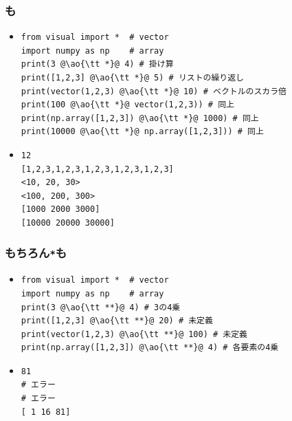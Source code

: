 \documentclass[10pt,dvipdfmx]{beamer}
\newcommand{\ao}[1]{{\color{blue}#1}}
\begin{document}
\begin{frame}[fragile]
\frametitle{{\tt *}も}
\begin{itemize}
\item<1-> []
\begin{lstlisting}
from visual import *  # vector
import numpy as np    # array
print(3 @\ao{\tt *}@ 4) # 掛け算
print([1,2,3] @\ao{\tt *}@ 5) # リストの繰り返し
print(vector(1,2,3) @\ao{\tt *}@ 10) # ベクトルのスカラ倍
print(100 @\ao{\tt *}@ vector(1,2,3)) # 同上
print(np.array([1,2,3]) @\ao{\tt *}@ 1000) # 同上
print(10000 @\ao{\tt *}@ np.array([1,2,3])) # 同上
\end{lstlisting}
\item<2-> []
\begin{lstlisting}
12
[1,2,3,1,2,3,1,2,3,1,2,3,1,2,3]
<10, 20, 30>
<100, 200, 300>
[1000 2000 3000]
[10000 20000 30000]
\end{lstlisting}
\end{itemize}
\end{frame}


\begin{frame}[fragile]
\frametitle{もちろん{\tt **}も}
\begin{itemize}
\item<1-> []
\begin{lstlisting}
from visual import *  # vector
import numpy as np    # array
print(3 @\ao{\tt **}@ 4) # 3の4乗
print([1,2,3] @\ao{\tt **}@ 20) # 未定義
print(vector(1,2,3) @\ao{\tt **}@ 100) # 未定義
print(np.array([1,2,3]) @\ao{\tt **}@ 4) # 各要素の4乗
\end{lstlisting}
\item<2-> []
\begin{lstlisting}
81
# エラー
# エラー
[ 1 16 81]
\end{lstlisting}
\end{itemize}
\end{frame}
\end{document}
